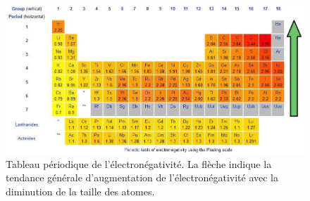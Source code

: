 \documentclass[12pt,oneside,letterpaper]{article}
\begin{document}
\begin{figure}[h]
\includegraphics[width=\textwidth]{Labos-Complements/Lab01/L01_pauling-scale.jpg}
\caption{\label{Pauling}Tableau périodique de l'électronégativité. La flèche indique la tendance générale d'augmentation de l'électronégativité avec la diminution de la taille des atomes.}
\end{figure}
\end{document}
